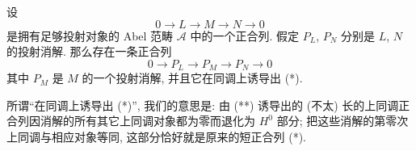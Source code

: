 \begin{lemma}\label{lem:7.8-horseshoe}
设
\begin{equation*}
0\to L\to M\to N\to 0\tag{*}
\end{equation*}
是拥有足够投射对象的 Abel 范畴 $\mathcal{A}$ 中的一个正合列. 假定 $P_L$, $P_N$ 分别是 $L$, $N$ 的投射消解. 那么存在一条正合列
\begin{equation*}
0\to P_L\to P_M\to P_N\to 0\tag{**}
\end{equation*}
其中 $P_M$ 是 $M$ 的一个投射消解, 并且它在同调上诱导出 (*).

所谓``在同调上诱导出 (*)'', 我们的意思是: 由 (**) 诱导出的 (不太) 长的上同调正合列因消解的所有其它上同调对象都为零而退化为 $H^0$ 部分; 把这些消解的第零次上同调与相应对象等同, 这部分恰好就是原来的短正合列 (*).
\end{lemma}


